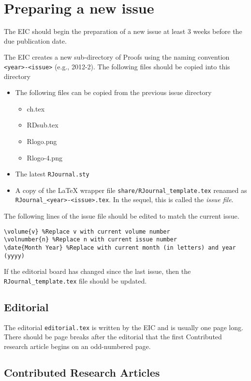 \documentclass[11pt]{article}
\begin{document}
\section{Preparing a new issue}

The EIC should begin the preparation of a new issue at least 3 weeks
before the due publication date.

The EIC creates a new sub-directory of Proofs using the naming
convention \verb+<year>-<issue>+ (e.g., 2012-2). The following files
should be copied into this directory

\begin{itemize}
\item The following files can be copied from the previous issue directory
\begin{itemize}
\item ch.tex
\item RDsub.tex
\item Rlogo.png
\item Rlogo-4.png
\end{itemize}
\item The latest \texttt{RJournal.sty}
\item A copy of the LaTeX wrapper file
  \verb+share/RJournal_template.tex+ renamed as
  \verb+RJournal_<year>-<issue>.tex+. In the sequel, this is called
  the {\em issue file}.
\end{itemize}

The following lines of the issue file should be edited to match the
current issue.
\begin{verbatim}
\volume{v} %Replace v with current volume number
\volnumber{n} %Replace n with current issue number
\date{Month Year} %Replace with current month (in letters) and year (yyyy)
\end{verbatim}

If the editorial board has changed since the last issue, then the
\verb+RJournal_template.tex+ file should be updated.

\subsection{Editorial}

The editorial \texttt{editorial.tex} is written by the EIC and is
usually one page long.  There should be page breaks after the
editorial that the first Contributed research article begins on an
odd-numbered page.

\subsection{Contributed Research Articles}
\end{document}
